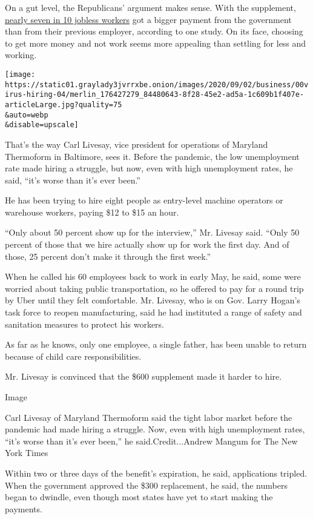 On a gut level, the Republicans' argument makes sense. With the
supplement,
\href{https://bfi.uchicago.edu/working-paper/2020-62/}{nearly seven in
10 jobless workers} got a bigger payment from the government than from
their previous employer, according to one study. On its face, choosing
to get more money and not work seems more appealing than settling for
less and working.

\texttt{[image: https://static01.graylady3jvrrxbe.onion/images/2020/09/02/business/00virus-hiring-04/merlin\_176427279\_84480643-8f28-45e2-ad5a-1c609b1f407e-articleLarge.jpg?quality=75\\\&auto=webp\\\&disable=upscale]}

That's the way Carl Livesay, vice president for operations of Maryland
Thermoform in Baltimore, sees it. Before the pandemic, the low
unemployment rate made hiring a struggle, but now, even with high
unemployment rates, he said, ``it's worse than it's ever been.''

He has been trying to hire eight people as entry-level machine operators
or warehouse workers, paying \$12 to \$15 an hour.

``Only about 50 percent show up for the interview,'' Mr. Livesay said.
``Only 50 percent of those that we hire actually show up for work the
first day. And of those, 25 percent don't make it through the first
week.''

When he called his 60 employees back to work in early May, he said, some
were worried about taking public transportation, so he offered to pay
for a round trip by Uber until they felt comfortable. Mr. Livesay, who
is on Gov. Larry Hogan's task force to reopen manufacturing, said he had
instituted a range of safety and sanitation measures to protect his
workers.

As far as he knows, only one employee, a single father, has been unable
to return because of child care responsibilities.

Mr. Livesay is convinced that the \$600 supplement made it harder to
hire.

Image

Carl Livesay of Maryland Thermoform said the tight labor market before
the pandemic had made hiring a struggle. Now, even with high
unemployment rates, ``it's worse than it's ever been,'' he
said.Credit...Andrew Mangum for The New York Times

Within two or three days of the benefit's expiration, he said,
applications tripled. When the government approved the \$300
replacement, he said, the numbers began to dwindle, even though most
states have yet to start making the payments.

